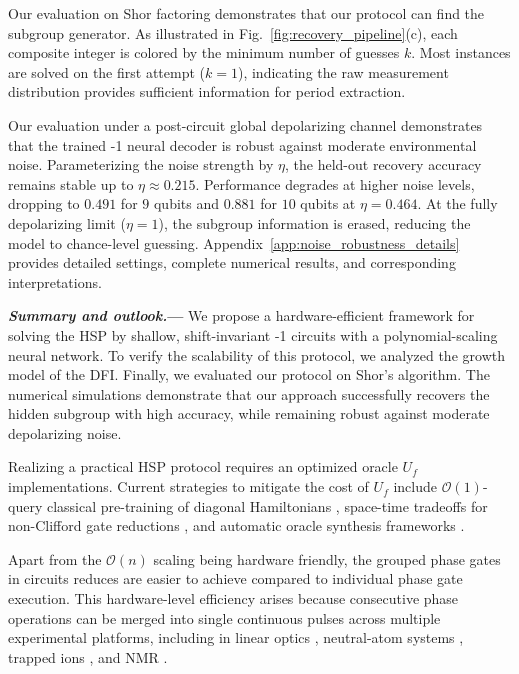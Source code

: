 \documentclass[reprint, aps, prl, superscriptaddress]{revtex4-2}
\renewcommand{\section}[1]{\par\medskip\noindent\textbf{{\textit{#1.}---}}}
\newcommand{\myqc}{\text{HP}}
\begin{document}
Our evaluation on Shor factoring demonstrates that our protocol can find the subgroup generator. As illustrated in Fig.~\ref{fig:recovery_pipeline}(c), each composite integer is colored by the minimum number of guesses $k$. Most instances are solved on the first attempt ($k=1$), indicating the raw measurement distribution provides sufficient information for period extraction. 

Our evaluation under a post-circuit global depolarizing channel demonstrates that the trained \myqc{}-1 neural decoder is robust against moderate environmental noise. Parameterizing the noise strength by $\eta$, the held-out recovery accuracy remains stable up to $\eta \approx 0.215$. Performance degrades at higher noise levels, dropping to $0.491$ for $9$ qubits and $0.881$ for $10$ qubits at $\eta=0.464$. At the fully depolarizing limit ($\eta=1$), the subgroup information is erased, reducing the model to chance-level guessing. Appendix~\ref{app:noise_robustness_details} provides detailed settings, complete numerical results, and corresponding interpretations.

\section{Summary and outlook}
We propose a hardware-efficient framework for solving the HSP by shallow, shift-invariant \myqc{}-1 circuits with a polynomial-scaling neural network. To verify the scalability of this protocol, we analyzed the growth model of the DFI. Finally, we evaluated our protocol on Shor's algorithm. The numerical simulations demonstrate that our approach successfully recovers the hidden subgroup with high accuracy, while remaining robust against moderate depolarizing noise.

Realizing a practical HSP protocol requires an optimized oracle $U_f$ implementations. Current strategies to mitigate the cost of $U_f$ include $\mathcal{O}(1)$-query classical pre-training of diagonal Hamiltonians \cite{learning_hamiltonian_2025}, space-time tradeoffs for non-Clifford gate reductions \cite{yu2025back}, and automatic oracle synthesis frameworks \cite{aos_qdk_2024}. 


Apart from the $\mathcal{O}(n)$ scaling being hardware friendly,  the grouped phase gates in \myqc circuits reduces are easier to achieve compared to individual phase gate execution. This hardware-level efficiency arises because consecutive phase operations can be merged into single continuous pulses across multiple experimental platforms, including in linear optics \cite{carolan2015universal, Kok2007}, neutral-atom systems \cite{saffman2010quantum, evered2023high, mohan2025parametrized}, trapped ions \cite{Leibfried2003, Tan2013}, and NMR \cite{vandersypen2004nmr}.





\end{document}
